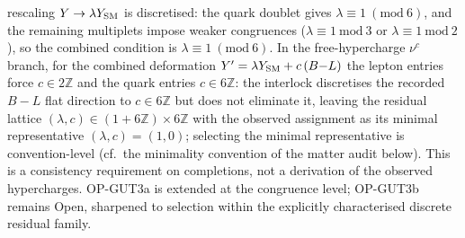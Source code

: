 rescaling $Y\to\lambda Y_{\rm SM}$ is discretised: the quark
doublet gives $\lambda\equiv1\ (\mathrm{mod}\ 6)$, and the
remaining multiplets impose weaker congruences
($\lambda\equiv1\ \mathrm{mod}\ 3$ or
$\lambda\equiv1\ \mathrm{mod}\ 2$), so the combined condition is
$\lambda\equiv1\ (\mathrm{mod}\ 6)$.
In the free-hypercharge $\nu^c$ branch, for the combined
deformation $Y'=\lambda Y_{\rm SM}+c\,(B{-}L)$ the lepton
entries force $c\in2\mathbb Z$ and the quark entries
$c\in6\mathbb Z$: the interlock discretises the recorded $B{-}L$
flat direction to $c\in6\mathbb Z$ but does not eliminate it,
leaving the residual lattice
$(\lambda,c)\in(1+6\mathbb Z)\times6\mathbb Z$ with the observed
assignment as its minimal representative $(\lambda,c)=(1,0)$;
selecting the minimal representative is convention-level
(cf.\ the minimality convention of the matter audit below).
This is a consistency requirement on completions, not a
derivation of the observed hypercharges.
OP-GUT3a is extended at the congruence level; OP-GUT3b remains
Open, sharpened to selection within the explicitly characterised
discrete residual family.


